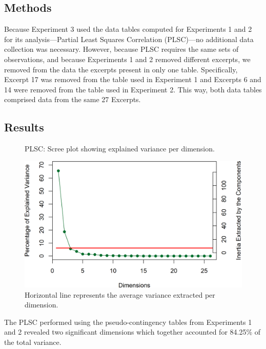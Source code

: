 \documentclass[
  english,
  man,floatsintext]{apa6}
\begin{document}
\hypertarget{methods-2}{%
\subsection{Methods}\label{methods-2}}

Because Experiment 3 used the data tables computed for Experiments 1 and 2 for its analysis---Partial Least Squares Correlation (PLSC)---no additional data collection was necessary. However, because PLSC requires the same sets of observations, and because Experiments 1 and 2 removed different excerpts, we removed from the data the excerpts present in only one table. Specifically, Excerpt 17 was removed from the table used in Experiment 1 and Excerpts 6 and 14 were removed from the table used in Experiment 2. This way, both data tables comprised data from the same 27 Excerpts.

\hypertarget{results-2}{%
\subsection{Results}\label{results-2}}

\begin{figure}  
  \begin{center}
  \caption{PLSC: Scree plot showing explained variance per dimension.}
    \includegraphics{./Music-Descriptor-Space_files/figure-latex/screePLSCcode-1.png}
  \caption*{Horizontal line represents the average variance extracted per dimension.}\label{fig:screePLSC}  
 \end{center}
\end{figure}

The PLSC performed using the pseudo-contingency tables from Experiments 1 and 2 revealed two significant dimensions which together accounted for 84.25\% of the total variance.
\end{document}

